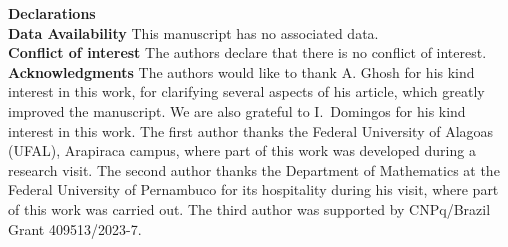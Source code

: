 \documentclass[a4paper, 12pt]{amsart}
\theoremstyle{definition}
\numberwithin{figure}{section}
\begin{document}
\textbf{Declarations}\\

\textbf{Data Availability} This manuscript has no associated data.\\

\textbf{Conflict of interest} The authors declare that there is no  conflict of interest.\\

\textbf{Acknowledgments} The authors would like to thank A. Ghosh for his kind interest in this work, for clarifying several aspects of his article, which greatly improved the manuscript. We are also grateful to I.~Domingos for his kind interest in this work.
The first author thanks the Federal University of Alagoas (UFAL), Arapiraca campus, where part of this work was developed during a research visit. The second author thanks the Department of Mathematics at the Federal University of Pernambuco for its hospitality during his visit, where part of this work was carried out. The third author was supported by CNPq/Brazil Grant 409513/2023-7.


\end{document}
